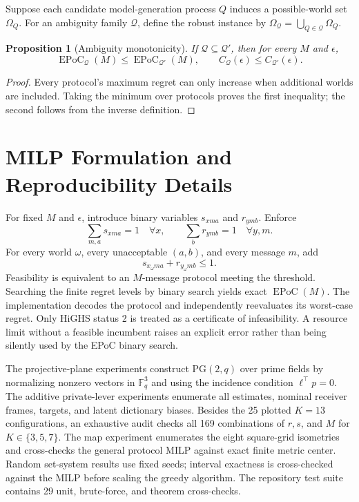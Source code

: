 \documentclass[letterpaper,10pt]{article}
\newtheorem{proposition}[theorem]{Proposition}
\newcommand{\EPoC}{\operatorname{EPoC}}
\begin{document}
Suppose each candidate model-generation process $Q$ induces a possible-world
set $\Omega_Q$. For an ambiguity family $\mathcal Q$, define the robust
instance by $\Omega_{\mathcal Q}=\bigcup_{Q\in\mathcal Q}\Omega_Q$.

\begin{proposition}[Ambiguity monotonicity]
If $\mathcal Q\subseteq\mathcal Q'$, then for every $M$ and $\epsilon$,
\[
\EPoC_{\mathcal Q}(M)\le\EPoC_{\mathcal Q'}(M),\qquad
C_{\mathcal Q}(\epsilon)\le C_{\mathcal Q'}(\epsilon).
\]
\end{proposition}
\begin{proof}
Every protocol's maximum regret can only increase when additional worlds are
included. Taking the minimum over protocols proves the first inequality; the
second follows from the inverse definition.
\end{proof}

\section{MILP Formulation and Reproducibility Details}

For fixed $M$ and $\epsilon$, introduce binary variables $s_{xma}$ and
$r_{ymb}$. Enforce
\[
\sum_{m,a}s_{xma}=1\quad\forall x,
\qquad
\sum_b r_{ymb}=1\quad\forall y,m.
\]
For every world $\omega$, every unacceptable $(a,b)$, and every message $m$,
add
\[
s_{x_\omega ma}+r_{y_\omega mb}\le1.
\]
Feasibility is equivalent to an $M$-message protocol meeting the threshold.
Searching the finite regret levels by binary search yields exact $\EPoC(M)$.
The implementation decodes the protocol and independently reevaluates its
worst-case regret. Only HiGHS status 2 is treated as a certificate of
infeasibility. A resource limit without a feasible incumbent raises an explicit
error rather than being silently used by the EPoC binary search.

The projective-plane experiments construct $\mathrm{PG}(2,q)$ over prime fields
by normalizing nonzero vectors in $\mathbb F_q^3$ and using the incidence
condition $\ell^\top p=0$. The additive private-lever experiments enumerate all estimates, nominal
receiver frames, targets, and latent dictionary biases. Besides the 25 plotted
$K=13$ configurations, an exhaustive audit checks all 169 combinations of
$r,s$, and $M$ for $K\in\{3,5,7\}$. The map experiment enumerates the eight
square-grid isometries and cross-checks the general protocol MILP against exact
finite metric center. Random set-system results use fixed seeds; interval
exactness is cross-checked against the MILP before scaling the greedy
algorithm. The repository test suite contains 29 unit, brute-force, and theorem
cross-checks.
\end{document}
